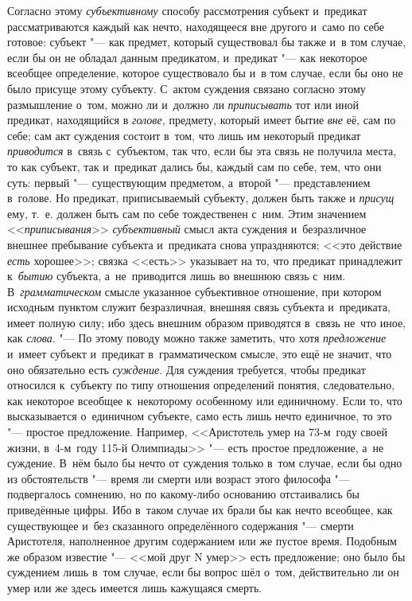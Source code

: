 Согласно этому {\em субъективному}
способу рассмотрения субъект и~предикат рассматриваются
каждый как нечто, находящееся вне другого и~само по себе готовое: субъект
"--- как предмет, который существовал бы также и~в том случае,
если бы он не обладал данным предикатом, и~предикат "--- как
некоторое всеобщее определение, которое существовало бы и~в том случае,
если бы оно не было присуще этому субъекту. С~актом суждения связано
согласно этому размышление о~том, можно ли и~должно ли
{\em приписывать} тот или иной предикат, находящийся в
{\em голове,} предмету, который имеет бытие {\em вне}
её, сам по себе; сам акт суждения состоит в~том, что лишь им
некоторый предикат {\em приводится}
в~связь с~субъектом, так что, если бы эта связь не получила
места, то как субъект, так и~предикат дались бы, каждый сам по себе, тем,
что они суть: первый "--- существующим предметом, а~второй
"--- представлением в~голове. Но предикат, приписываемый
субъекту, должен быть также и {\em присущ} ему, т.~е.
должен быть сам по себе тождественен с~ним. Этим значением
<<{\em приписывания}>> {\em субъективный} смысл
акта суждения и~безразличное внешнее пребывание субъекта и~предиката снова
упраздняются; <<это действие {\em есть} хорошее>>; связка <<есть>> указывает
на то, что предикат принадлежит к~{\em бытию} субъекта, а~не~приводится лишь
во внешнюю связь с~ним. В~{\em грамматическом} смысле указанное субъективное
отношение, при котором исходным пунктом служит безразличная, внешняя связь
субъекта и~предиката, имеет полную силу; ибо здесь внешним образом приводятся
в~связь не~что иное, как {\em слова}. "--- По этому поводу можно также
заметить, что хотя {\em предложение} и~имеет субъект и~предикат
в~грамматическом смысле, это ещё не значит, что оно обязательно есть
{\em суждение}. Для суждения требуется, чтобы предикат относился к~субъекту
по типу отношения определений понятия, следовательно, как некоторое
всеобщее к~некоторому особенному или единичному. Если то,
что высказывается о~единичном субъекте, само есть лишь нечто единичное, то
это "--- простое предложение. Например, <<Аристотель умер на 73-м~году своей
жизни, в~4-м~году 115-й
Олимпиады>> "--- есть простое предложение, а~не суждение. В~нём было бы нечто
от суждения только в~том случае, если бы одно из обстоятельств "--- время ли
смерти или возраст этого философа "--- подвергалось сомнению, но по какому-либо
основанию отстаивались бы приведённые цифры. Ибо в~таком случае их брали бы как
нечто всеобщее, как существующее и~без сказанного определённого содержания "---
смерти Аристотеля, наполненное другим содержанием или же пустое время. Подобным
же образом известие "--- <<мой друг N умер>> есть предложение; оно было бы
суждением лишь в~том случае, если бы вопрос шёл о~том, действительно ли он умер
или же здесь имеется лишь кажущаяся смерть.


